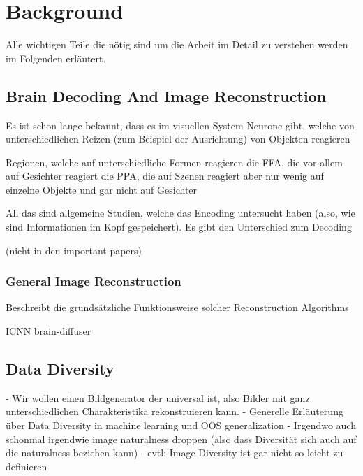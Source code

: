 \chapter{Background}

Alle wichtigen Teile die nötig sind um die Arbeit im Detail zu verstehen werden im Folgenden erläutert. 

\section{Brain Decoding And Image Reconstruction}


\cite{grill-spectorHUMANVISUALCORTEX2004} Es ist schon lange bekannt, dass es im visuellen System Neurone gibt, welche von unterschiedlichen Reizen (zum Beispiel der Ausrichtung) von Objekten reagieren

\cite{kourtziCorticalRegionsInvolved2000} Regionen, welche auf unterschiedliche Formen reagieren
\cite{kanwisherFusiformFaceArea1997} die FFA, die vor allem auf Gesichter reagiert
\cite{epsteinCorticalRepresentationLocal1998} die PPA, die auf Szenen reagiert aber nur wenig auf einzelne Objekte und gar nicht auf Gesichter

All das sind allgemeine Studien, welche das Encoding untersucht haben (also, wie sind Informationen im Kopf gespeichert). Es gibt den Unterschied zum Decoding \cite{naselarisEncodingDecodingFMRI2011}

\cite{kamitaniDecodingVisualSubjective2005} 

\cite{miyawakiVisualImageReconstruction2008}

\cite{horikawaGenericDecodingSeen2017} (nicht in den important papers)

\cite{horikawaAttentionModulatesNeural2022}
\cite{chengReconstructingVisualIllusory2023}

\subsection{General Image Reconstruction}

\cite{shirakawaSpuriousReconstructionBrain2024} Beschreibt die grundsätzliche Funktionsweise solcher Reconstruction Algorithms

\cite{shenDeepImageReconstruction2019} ICNN
\cite{ozcelikNaturalSceneReconstruction2023} brain-diffuser


\section{Data Diversity}
- Wir wollen einen Bildgenerator der universal ist, also Bilder mit ganz unterschiedlichen Charakteristika rekonstruieren kann.
- Generelle Erläuterung über Data Diversity in machine learning und OOS generalization
- Irgendwo auch schonmal irgendwie image naturalness droppen (also dass Diversität sich auch auf die naturalness beziehen kann)
- evtl: Image Diversity ist gar nicht so leicht zu definieren

